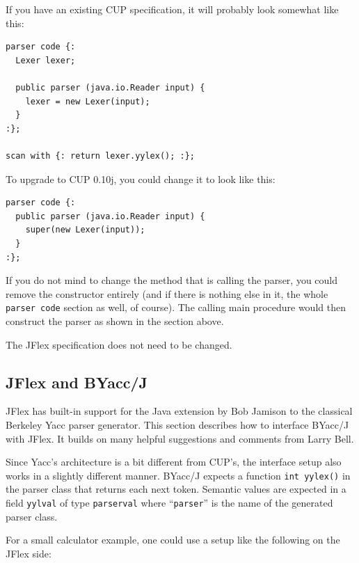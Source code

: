 \documentclass[11pt]{scrartcl}
\newcommand{\xsmall}{}
\begin{document}
If you have an existing CUP specification, it will probably look somewhat like this:
{\xsmall\begin{verbatim}
parser code {:
  Lexer lexer;

  public parser (java.io.Reader input) {
    lexer = new Lexer(input);
  }
:};

scan with {: return lexer.yylex(); :};
\end{verbatim}
}

To upgrade to CUP 0.10j, you could change it to look like this:
{\xsmall\begin{verbatim}
parser code {:
  public parser (java.io.Reader input) {
    super(new Lexer(input));
  }
:};
\end{verbatim}
}

If you do not mind to change the method that is calling the parser,
you could remove the constructor entirely (and if there is nothing else
in it, the whole \texttt{parser code} section as well, of course). The calling
main procedure would then construct the parser as shown in the section above.

The JFlex specification does not need to be changed.


\subsection{JFlex and BYacc/J\label{YaccWork}}

JFlex has built-in support for the Java extension 
\cite{BYaccJ} by Bob Jamison
to the classical Berkeley Yacc parser generator.
This section describes how to interface BYacc/J with JFlex. It
builds on many helpful suggestions and comments from Larry Bell.

Since Yacc's architecture is a bit different from CUP's, the
interface setup also works in a slightly different manner.
BYacc/J expects a function \texttt{int yylex()} in the parser
class that returns each next token. Semantic values are expected
in a field \texttt{yylval} of type \texttt{parserval} where ``\texttt{parser}''
is the name of the generated parser class.

For a small calculator example, one could use a setup like the 
following on the JFlex side:
\end{document}
